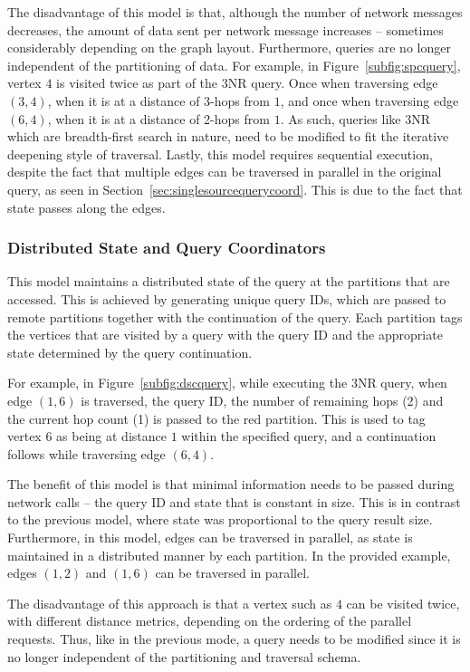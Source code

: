 The disadvantage of this model is that, although the number of network messages
decreases, the amount of data sent per network message increases -- sometimes
considerably depending on the graph layout. Furthermore, queries are no longer
independent of the partitioning of data. For example, in
Figure~\ref{subfig:spcquery}, vertex $4$ is visited twice as part of the 3NR
query. Once when traversing edge $(3, 4)$, when it is at a distance of 3-hops
from $1$, and once when traversing edge $(6, 4)$, when it is at a distance of
2-hops from $1$. As such, queries like 3NR which are breadth-first search in
nature, need to be modified to fit the iterative deepening style of traversal.
Lastly, this model requires sequential execution, despite the fact that multiple
edges can be traversed in parallel in the original query, as seen in
Section~\ref{sec:singlesourcequerycoord}. This is due to the fact that state
passes along the edges.

\subsubsection{Distributed State and Query Coordinators}
\label{sec:distributedstatequerycoord}

This model maintains a distributed state of the query at the partitions that are
accessed. This is achieved by generating unique query IDs, which are passed to
remote partitions together with the continuation of the query. Each partition
tags the vertices that are visited by a query with the query ID and the
appropriate state determined by the query continuation.

For example, in Figure~\ref{subfig:dscquery}, while executing the 3NR query,
when edge $(1, 6)$ is traversed, the query ID, the number of remaining
hops (2) and the current hop count (1) is passed to the red partition. This is
used to tag vertex $6$ as being at distance $1$ within the specified query, and
a continuation follows while traversing edge $(6, 4)$.

The benefit of this model is that minimal information needs to be passed during
network calls -- the query ID and state that is constant in size. This is in
contrast to the previous model, where state was proportional to the query result
size. Furthermore, in this model, edges can be traversed in parallel, as state
is maintained in a distributed manner by each partition. In the provided
example, edges $(1, 2)$ and $(1, 6)$ can be traversed in parallel.

The disadvantage of this approach is that a vertex such as $4$ can be visited
twice, with different distance metrics, depending on the ordering of the
parallel requests. Thus, like in the previous mode, a query needs to be modified
since it is no longer independent of the partitioning and traversal schema.
